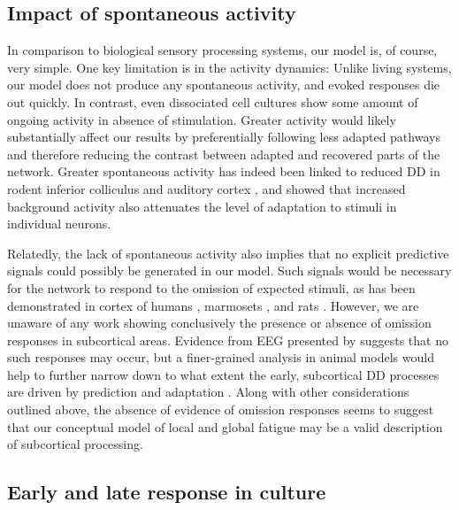 \documentclass[9pt,lineno,onehalfspacing]{elife}
\begin{document}
\subsection{Impact of spontaneous activity}

In comparison to biological sensory processing systems, our model is, of course, very simple. One key limitation is in the activity dynamics: Unlike living systems, our model does not produce any spontaneous activity, and evoked responses die out quickly. In contrast, even dissociated cell cultures show some amount of ongoing activity in absence of stimulation. Greater activity would likely substantially affect our results by preferentially following less adapted pathways and therefore reducing the contrast between adapted and recovered parts of the network. Greater spontaneous activity has indeed been linked to reduced DD in rodent inferior colliculus \citep{Duque2012-vx, Duque2015-eu} and auditory cortex \citep{Klein2014-op}, and \cite{Abolafia2011-ig} showed that increased background activity also attenuates the level of adaptation to stimuli in individual neurons.

Relatedly, the lack of spontaneous activity also implies that no explicit predictive signals could possibly be generated in our model. Such signals would be necessary for the network to respond to the omission of expected stimuli, as has been demonstrated in cortex of humans \citep{Lehmann2016-ol, Demarchi2019-ch}, marmosets \citep{Jiang2022-ak}, and rats \citep{Auksztulewicz2023-ta}. However, we are unaware of any work showing conclusively the presence or absence of omission responses in subcortical areas. Evidence from EEG presented by \cite{Lehmann2016-ol} suggests that no such responses may occur, but a finer-grained analysis in animal models would help to further narrow down to what extent the early, subcortical DD processes are driven by prediction and adaptation \citep{Schlossmacher2022-zv}. Along with other considerations outlined above, the absence of evidence of omission responses seems to suggest that our conceptual model of local and global fatigue may be a valid description of subcortical processing.

\subsection{Early and late response in culture}
\end{document}
